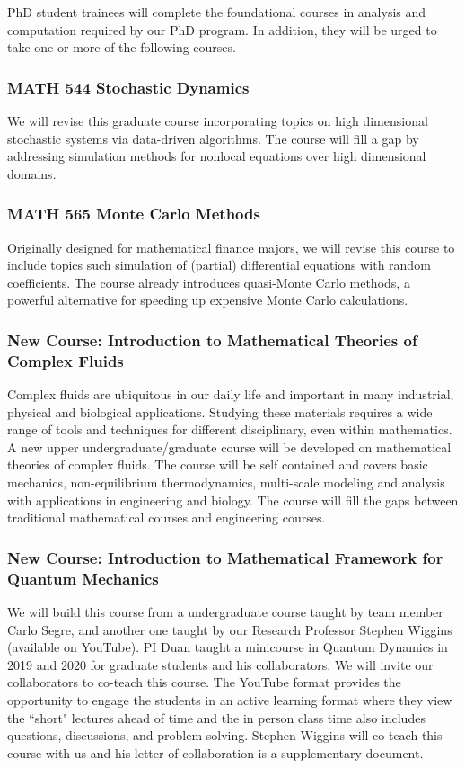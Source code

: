 \documentclass[11pt]{NSFamsart}
\begin{document}
PhD student trainees will complete the foundational courses in analysis and computation required by our PhD program.  In addition, they will be urged to take one or more of the following courses.

\subsubsection*{MATH 544 Stochastic Dynamics}
We will revise this graduate course  incorporating topics on  high dimensional stochastic systems via data-driven algorithms.  The course will fill a gap by addressing simulation methods for nonlocal equations over high dimensional domains.

\subsubsection*{MATH 565 Monte Carlo Methods} Originally designed for mathematical finance majors, we will revise this course to include topics such simulation of (partial) differential equations with random coefficients.  The course already introduces quasi-Monte Carlo methods, a powerful alternative for speeding up expensive Monte Carlo calculations.

\subsubsection*{New Course: Introduction to Mathematical Theories of Complex Fluids} 
Complex fluids are ubiquitous in our daily life and important in many industrial, physical and biological applications. Studying these materials requires a wide range 
of tools and techniques for different disciplinary, even within mathematics. A new upper undergraduate/graduate course will be developed on mathematical theories of complex fluids. The course will be self contained and covers basic mechanics, non-equilibrium thermodynamics, multi-scale modeling and analysis with applications in engineering and biology. The course will fill the gaps between traditional mathematical courses and engineering courses.
 
\subsubsection*{New Course: Introduction to Mathematical Framework for Quantum Mechanics} We will build this course from  a   undergraduate course   taught by team member Carlo Segre, and another one taught by our Research Professor Stephen Wiggins (available on YouTube). PI Duan   taught a minicourse in Quantum Dynamics \cite{Gutzwiller1990ChaosIC, Holland1993TheQT,Lindgren2019QuantumMC,Micha2006QuantumDW} in 2019 and 2020 for graduate students and his collaborators.  We will invite our collaborators to co-teach this course. 
The YouTube format provides the opportunity to engage the students in an active learning format where they view the “short" lectures ahead of time and the in person class time  also includes  questions, discussions, and problem solving. Stephen Wiggins will co-teach this course with us and his letter of collaboration is a supplementary document.
\end{document}
